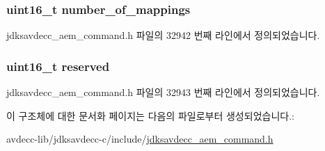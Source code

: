 \subsubsection[{\texorpdfstring{number\+\_\+of\+\_\+mappings}{number_of_mappings}}]{\setlength{\rightskip}{0pt plus 5cm}uint16\+\_\+t number\+\_\+of\+\_\+mappings}\hypertarget{structjdksavdecc__aem__command__remove__sensor__mappings_ac7db472c5622ef473d5d0a5c416d5531}{}\label{structjdksavdecc__aem__command__remove__sensor__mappings_ac7db472c5622ef473d5d0a5c416d5531}


jdksavdecc\+\_\+aem\+\_\+command.\+h 파일의 32942 번째 라인에서 정의되었습니다.

\subsubsection[{\texorpdfstring{reserved}{reserved}}]{\setlength{\rightskip}{0pt plus 5cm}uint16\+\_\+t reserved}\hypertarget{structjdksavdecc__aem__command__remove__sensor__mappings_a5a6ed8c04a3db86066924b1a1bf4dad3}{}\label{structjdksavdecc__aem__command__remove__sensor__mappings_a5a6ed8c04a3db86066924b1a1bf4dad3}


jdksavdecc\+\_\+aem\+\_\+command.\+h 파일의 32943 번째 라인에서 정의되었습니다.



이 구조체에 대한 문서화 페이지는 다음의 파일로부터 생성되었습니다.\+:\begin{DoxyCompactItemize}
\item 
avdecc-\/lib/jdksavdecc-\/c/include/\hyperlink{jdksavdecc__aem__command_8h}{jdksavdecc\+\_\+aem\+\_\+command.\+h}\end{DoxyCompactItemize}
